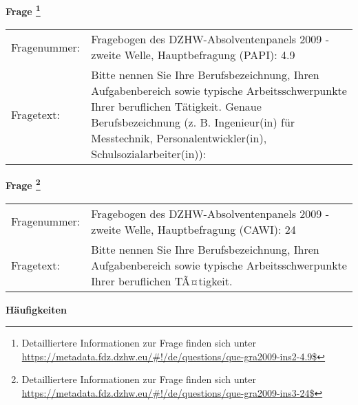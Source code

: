 				\vspace*{0.5cm}
                \noindent\textbf{Frage
	                \footnote{Detailliertere Informationen zur Frage finden sich unter
		              \url{https://metadata.fdz.dzhw.eu/\#!/de/questions/que-gra2009-ins2-4.9$}}}\\
				\begin{tabularx}{\hsize}{@{}lX}
					Fragenummer: &
					  Fragebogen des DZHW-Absolventenpanels 2009 - zweite Welle, Hauptbefragung (PAPI):
					  4.9
 \\
					Fragetext: & Bitte nennen Sie Ihre Berufsbezeichnung, Ihren Aufgabenbereich sowie typische Arbeitsschwerpunkte Ihrer beruflichen Tätigkeit. Genaue Berufsbezeichnung (z. B. Ingenieur(in) für Messtechnik, Personalentwickler(in), Schulsozialarbeiter(in)): \\
				\end{tabularx}
				\vspace*{0.5cm}
                \noindent\textbf{Frage
	                \footnote{Detailliertere Informationen zur Frage finden sich unter
		              \url{https://metadata.fdz.dzhw.eu/\#!/de/questions/que-gra2009-ins3-24$}}}\\
				\begin{tabularx}{\hsize}{@{}lX}
					Fragenummer: &
					  Fragebogen des DZHW-Absolventenpanels 2009 - zweite Welle, Hauptbefragung (CAWI):
					  24
 \\
					Fragetext: & Bitte nennen Sie Ihre Berufsbezeichnung, Ihren Aufgabenbereich sowie typische Arbeitsschwerpunkte Ihrer beruflichen TÃ¤tigkeit. \\
				\end{tabularx}





        		\vspace*{0.5cm}
                \noindent\textbf{Häufigkeiten}

